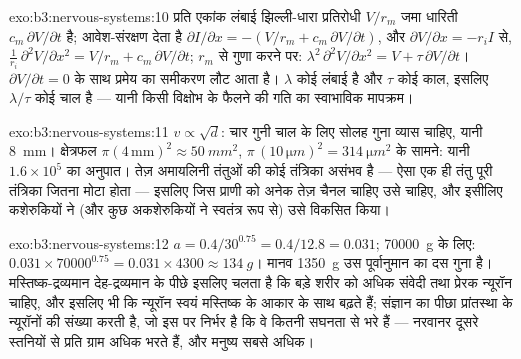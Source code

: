 \begin{solution}{exo:b3:nervous-systems:10}
प्रति एकांक लंबाई झिल्ली-धारा प्रतिरोधी $V/r_{m}$ जमा धारिती
$c_{m}\,\partial V/\partial t$ है; आवेश-संरक्षण देता है
$\partial I/\partial x = -(V/r_{m} + c_{m}\,\partial V/\partial t)$, और
$\partial V/\partial x = -r_{i}I$ से, $\frac{1}{r_{i}}\,\partial^{2}V/
\partial x^{2} = V/r_{m} + c_{m}\,\partial V/\partial t$;
$r_{m}$ से गुणा करने पर: $\lambda^{2}\,\partial^{2}V/\partial x^{2} = V + \tau\,\partial
V/\partial t$। $\partial V/\partial t = 0$ के साथ प्रमेय का समीकरण
लौट आता है। $\lambda$ कोई लंबाई है और $\tau$ कोई काल, इसलिए
$\lambda/\tau$ कोई चाल है --- यानी किसी विक्षोभ के फैलने की गति का
स्वाभाविक मापक्रम।
\end{solution}

\begin{solution}{exo:b3:nervous-systems:11}
$v \propto \sqrt{d}$: चार गुनी चाल के लिए सोलह गुना व्यास चाहिए, यानी
\qty{8}{mm}। क्षेत्रफल $\pi(4\,\text{mm})^{2} \approx \qty{50}{mm^2}$,
$\pi\,(10\,\unit{\micro m})^{2} = \qty{314}{\micro m^2}$ के सामने: यानी
$1.6\times 10^{5}$ का अनुपात। तेज़ अमायलिनी तंतुओं की कोई तंत्रिका
असंभव है --- ऐसा एक ही तंतु पूरी तंत्रिका जितना मोटा होता --- इसलिए
जिस प्राणी को अनेक तेज़ चैनल चाहिए उसे  चाहिए, और इसीलिए
कशेरुकियों ने (और कुछ अकशेरुकियों ने स्वतंत्र रूप से) उसे विकसित किया।
\end{solution}

\begin{solution}{exo:b3:nervous-systems:12}
$a = 0.4/30^{0.75} = 0.4/12.8 = 0.031$; \qty{70000}{g} के लिए: $0.031\times
\num{70000}^{0.75} = 0.031\times 4300 \approx \qty{134}{g}$। मानव
\qty{1350}{g} उस पूर्वानुमान का दस गुना है। मस्तिष्क-द्रव्यमान
देह-द्रव्यमान के पीछे इसलिए चलता है कि बड़े शरीर को अधिक संवेदी तथा
प्रेरक न्यूरॉन चाहिए, और इसलिए भी कि न्यूरॉन स्वयं मस्तिष्क के आकार के
साथ बढ़ते हैं; संज्ञान का पीछा प्रांतस्था के न्यूरॉनों की संख्या करती
है, जो इस पर निर्भर है कि वे कितनी सघनता से भरे हैं --- नरवानर दूसरे
स्तनियों से प्रति ग्राम अधिक भरते हैं, और मनुष्य सबसे अधिक।
\end{solution}


